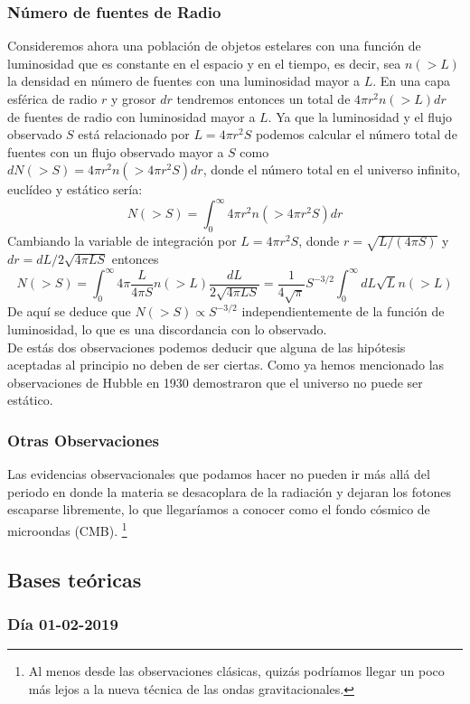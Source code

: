 \subsubsection{Número de fuentes de Radio}
Consideremos ahora una población de objetos estelares con una función de luminosidad que es constante en el espacio y en el tiempo, es decir, sea $n(>L)$ la densidad en número de fuentes con una luminosidad mayor a $L$. En una capa esférica de radio $r$ y grosor $dr$ tendremos entonces un total de $4\pi r^2 n(>L)dr$ de fuentes de radio con luminosidad mayor a $L$. Ya que la luminosidad y el flujo observado $S$ está relacionado por $L=4\pi r^2 S$ podemos calcular el número total de fuentes con un flujo observado mayor a $S$ como $dN(>S)=4\pi r^2 n(>4\pi r^2 S) dr$, donde el número total en el universo infinito, euclídeo y estático sería:
\begin{equation}
N(>S)=\int_0^\infty 4\pi r^2 n(>4\pi r^2 S) dr
\end{equation}
Cambiando la variable de integración por $L=4\pi r^2 S$, donde $r=\sqrt{L/(4\pi S)}$ y $dr=dL/2\sqrt{4\pi L S}$ entonces
\begin{equation}
N(>S)=\int_0^\infty 4\pi \frac{L}{4\pi S} n(>L) \frac{dL}{2\sqrt{4\pi L S}}=\frac{1}{4\sqrt{\pi}}S^{-3/2}\int_0^\infty	dL\sqrt{L}n(>L)
\end{equation}
De aquí se deduce que $N(>S)\propto S^{-3/2}$ independientemente de la función de luminosidad, lo que es una discordancia con lo observado.\\

De estás dos observaciones podemos deducir que alguna de las hipótesis aceptadas al principio no deben de ser ciertas. Como ya hemos mencionado las observaciones de Hubble en 1930 demostraron que el universo no puede ser estático.

\subsubsection{Otras Observaciones}
Las evidencias observacionales que podamos hacer no pueden ir más allá del periodo en donde la materia se desacoplara de la radiación y dejaran los fotones escaparse libremente, lo que llegaríamos a conocer como el fondo cósmico de microondas (CMB). \footnote{Al menos desde las observaciones clásicas, quizás podríamos llegar un poco más lejos a la nueva técnica de las ondas gravitacionales.}

\subsection{Bases teóricas}
\subsubsection{Día 01-02-2019}
